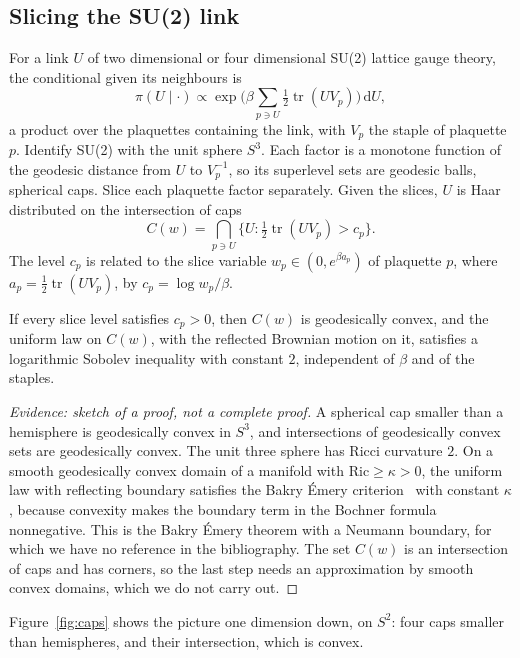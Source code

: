 \subsection{Slicing the SU(2) link}

For a link $U$ of two dimensional or four dimensional SU(2) lattice gauge theory, the conditional given its neighbours is
\[
\pi(U\mid\cdot)\propto\exp\Big(\beta\sum_{p\ni U}\tfrac12\operatorname{tr}(UV_p)\Big)\,\mathrm dU,
\]
a product over the plaquettes containing the link, with $V_p$ the staple of plaquette $p$. Identify SU(2) with the unit sphere $S^3$. Each factor is a monotone function of the geodesic distance from $U$ to $V_p^{-1}$, so its superlevel sets are geodesic balls, spherical caps. Slice each plaquette factor separately. Given the slices, $U$ is Haar distributed on the intersection of caps
\[
C(w)=\bigcap_{p\ni U}\big\{U:\tfrac12\operatorname{tr}(UV_p)>c_p\big\}.
\]
The level $c_p$ is related to the slice variable $w_p\in(0,e^{\beta a_p})$ of plaquette $p$, where $a_p=\frac12\operatorname{tr}(UV_p)$, by $c_p=\log w_p/\beta$.

\begin{conjecture}\label{prop:slicecurv}
If every slice level satisfies $c_p>0$, then $C(w)$ is geodesically convex, and the uniform law on $C(w)$, with the reflected Brownian motion on it, satisfies a logarithmic Sobolev inequality with constant $2$, independent of $\beta$ and of the staples.
\end{conjecture}

\begin{proof}[Evidence: sketch of a proof, not a complete proof]
\renewcommand{\qedsymbol}{}
A spherical cap smaller than a hemisphere is geodesically convex in $S^3$, and intersections of geodesically convex sets are geodesically convex. The unit three sphere has Ricci curvature $2$. On a smooth geodesically convex domain of a manifold with $\mathrm{Ric}\ge\kappa>0$, the uniform law with reflecting boundary satisfies the Bakry \'Emery criterion~\cite{BE} with constant $\kappa$, because convexity makes the boundary term in the Bochner formula nonnegative. This is the Bakry \'Emery theorem with a Neumann boundary, for which we have no reference in the bibliography. The set $C(w)$ is an intersection of caps and has corners, so the last step needs an approximation by smooth convex domains, which we do not carry out.
\end{proof}

Figure~\ref{fig:caps} shows the picture one dimension down, on $S^2$: four caps smaller than hemispheres, and their intersection, which is convex.

